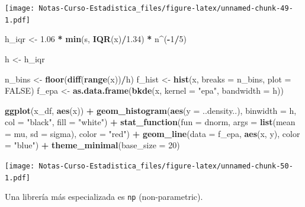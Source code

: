 \documentclass[
  12pt,
]{book}
\newenvironment{Shaded}{\begin{snugshade}}{\end{snugshade}}
\newcommand{\DataTypeTok}[1]{\textcolor[rgb]{0.13,0.29,0.53}{#1}}
\newcommand{\DecValTok}[1]{\textcolor[rgb]{0.00,0.00,0.81}{#1}}
\newcommand{\FloatTok}[1]{\textcolor[rgb]{0.00,0.00,0.81}{#1}}
\newcommand{\KeywordTok}[1]{\textcolor[rgb]{0.13,0.29,0.53}{\textbf{#1}}}
\newcommand{\NormalTok}[1]{#1}
\newcommand{\OperatorTok}[1]{\textcolor[rgb]{0.81,0.36,0.00}{\textbf{#1}}}
\newcommand{\OtherTok}[1]{\textcolor[rgb]{0.56,0.35,0.01}{#1}}
\newcommand{\StringTok}[1]{\textcolor[rgb]{0.31,0.60,0.02}{#1}}
\theoremstyle{definition}
\theoremstyle{definition}
\theoremstyle{definition}
\theoremstyle{remark}
\begin{document}
\texttt{[image: Notas-Curso-Estadistica\_files/figure-latex/unnamed-chunk-49-1.pdf]}

\begin{Shaded}
\begin{Highlighting}[]
\NormalTok{h_iqr <-}\StringTok{ }\FloatTok{1.06} \OperatorTok{*}\StringTok{ }\KeywordTok{min}\NormalTok{(s, }\KeywordTok{IQR}\NormalTok{(x)}\OperatorTok{/}\FloatTok{1.34}\NormalTok{) }\OperatorTok{*}\StringTok{ }\NormalTok{n}\OperatorTok{^}\NormalTok{(}\OperatorTok{-}\DecValTok{1}\OperatorTok{/}\DecValTok{5}\NormalTok{)}

\NormalTok{h <-}\StringTok{ }\NormalTok{h_iqr}

\NormalTok{n_bins <-}\StringTok{ }\KeywordTok{floor}\NormalTok{(}\KeywordTok{diff}\NormalTok{(}\KeywordTok{range}\NormalTok{(x))}\OperatorTok{/}\NormalTok{h)}
\NormalTok{f_hist <-}\StringTok{ }\KeywordTok{hist}\NormalTok{(x, }\DataTypeTok{breaks =}\NormalTok{ n_bins, }\DataTypeTok{plot =} \OtherTok{FALSE}\NormalTok{)}
\NormalTok{f_epa <-}\StringTok{ }\KeywordTok{as.data.frame}\NormalTok{(}\KeywordTok{bkde}\NormalTok{(x, }\DataTypeTok{kernel =} \StringTok{"epa"}\NormalTok{, }\DataTypeTok{bandwidth =}\NormalTok{ h))}

\KeywordTok{ggplot}\NormalTok{(x_df, }\KeywordTok{aes}\NormalTok{(x)) }\OperatorTok{+}\StringTok{ }\KeywordTok{geom_histogram}\NormalTok{(}\KeywordTok{aes}\NormalTok{(}\DataTypeTok{y =}\NormalTok{ ..density..), }
    \DataTypeTok{binwidth =}\NormalTok{ h, }\DataTypeTok{col =} \StringTok{"black"}\NormalTok{, }\DataTypeTok{fill =} \StringTok{"white"}\NormalTok{) }\OperatorTok{+}\StringTok{ }
\StringTok{    }\KeywordTok{stat_function}\NormalTok{(}\DataTypeTok{fun =}\NormalTok{ dnorm, }\DataTypeTok{args =} \KeywordTok{list}\NormalTok{(}\DataTypeTok{mean =}\NormalTok{ mu, }
        \DataTypeTok{sd =}\NormalTok{ sigma), }\DataTypeTok{color =} \StringTok{"red"}\NormalTok{) }\OperatorTok{+}\StringTok{ }\KeywordTok{geom_line}\NormalTok{(}\DataTypeTok{data =}\NormalTok{ f_epa, }
    \KeywordTok{aes}\NormalTok{(x, y), }\DataTypeTok{color =} \StringTok{"blue"}\NormalTok{) }\OperatorTok{+}\StringTok{ }\KeywordTok{theme_minimal}\NormalTok{(}\DataTypeTok{base_size =} \DecValTok{20}\NormalTok{)}
\end{Highlighting}
\end{Shaded}

\texttt{[image: Notas-Curso-Estadistica\_files/figure-latex/unnamed-chunk-50-1.pdf]}

Una librería más especializada es \texttt{np} (non-parametric).
\end{document}
